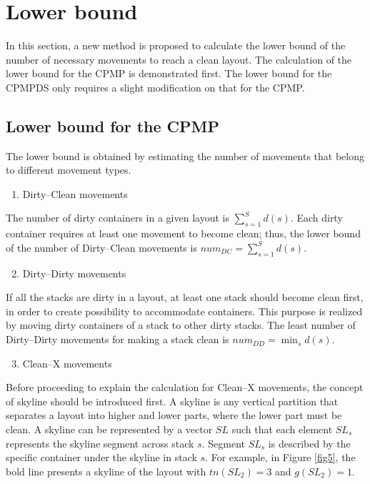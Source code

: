 \documentclass[review,3p,times,authoryear,12pt]{elsarticle}
\begin{document}
\section{Lower bound}
\label{sec:cf}

In this section, a new method is proposed to calculate the lower bound of the number of necessary movements to reach a clean layout. 
The calculation of the lower bound for the CPMP is demonstrated first. 
The lower bound for the CPMPDS only requires a slight modification on that for the CPMP.

\subsection{Lower bound for the CPMP}

The lower bound is obtained by estimating the number of movements that belong to different movement types.

\begin{enumerate}
\setcounter{enumi}{0}
\item Dirty--Clean movements
\end{enumerate}

The number of dirty containers in a given layout is $\sum_{s=1}^S d(s)$. 
Each dirty container requires at least one movement to become clean; thus, the lower bound of the number of Dirty--Clean movements is $\mathit{num}_\mathit{DC}=\sum_{s=1}^S d(s)$.

\begin{enumerate}
\setcounter{enumi}{1}
\item Dirty--Dirty movements
\end{enumerate}

If all the stacks are dirty in a layout, at least one stack should become clean first, in order to create possibility to accommodate containers. 
This purpose is realized by moving dirty containers of a stack to other dirty stacks. 
The least number of Dirty--Dirty movements for making a stack clean is $\mathit{num}_\mathit{DD} = \min_s d(s)$.

\begin{enumerate}
\setcounter{enumi}{2}
\item Clean--X movements
\end{enumerate}

Before proceeding to explain the calculation for Clean--X movements, the concept of skyline should be introduced first. 
A skyline is any vertical partition that separates a layout into higher and lower parts, where the lower part must be clean. 
A skyline can be represented by a vector $\mathit{SL}$ such that each element $\mathit{SL}_s$ represents the skyline segment across stack $s$. 
Segment $\mathit{SL}_s$ is described by the specific container under the skyline in stack $s$.
For example, in Figure \ref{fig5}, the bold line presents a skyline of the layout with $\mathit{tn}(\mathit{SL}_{2})=3$ and $g(\mathit{SL}_{2})=1$.
\end{document}
